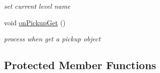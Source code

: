 \begin{DoxyCompactItemize}
\begin{DoxyCompactList}\small\item\em set current level name \end{DoxyCompactList}\item 
void \hyperlink{class_basic_tutorial__00_a5e5d38d07a0e01b1f7bf4771b01e276e}{on\+Pickup\+Get} ()\hypertarget{class_basic_tutorial__00_a5e5d38d07a0e01b1f7bf4771b01e276e}{}\label{class_basic_tutorial__00_a5e5d38d07a0e01b1f7bf4771b01e276e}

\begin{DoxyCompactList}\small\item\em process when get a pickup object \end{DoxyCompactList}\end{DoxyCompactItemize}
\subsection*{Protected Member Functions}
